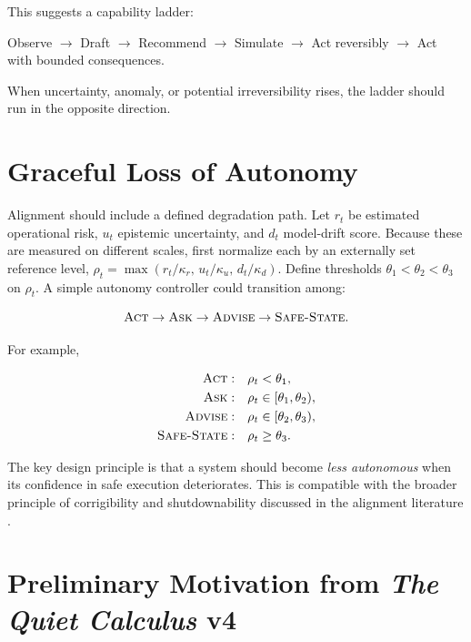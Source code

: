 \documentclass[11pt]{article}
\begin{document}
This suggests a capability ladder:

\begin{center}
Observe $\rightarrow$ Draft $\rightarrow$ Recommend $\rightarrow$ Simulate $\rightarrow$ Act reversibly $\rightarrow$ Act with bounded consequences.
\end{center}

When uncertainty, anomaly, or potential irreversibility rises, the ladder should run in the opposite direction.

\section{Graceful Loss of Autonomy}
\label{sec:graceful}

Alignment should include a defined degradation path. Let $r_t$ be estimated operational risk, $u_t$ epistemic uncertainty, and $d_t$ model-drift score. Because these are measured on different scales, first normalize each by an externally set reference level, $\rho_t=\max(r_t/\kappa_r,\,u_t/\kappa_u,\,d_t/\kappa_d)$. Define thresholds $\theta_1 < \theta_2 < \theta_3$ on $\rho_t$. A simple autonomy controller could transition among:

\begin{equation}
    \textsc{Act} \rightarrow \textsc{Ask} \rightarrow \textsc{Advise} \rightarrow \textsc{Safe-State}.
\end{equation}

For example,

\begin{align}
\textsc{Act}:&\quad \rho_t < \theta_1,\\
\textsc{Ask}:&\quad \rho_t \in [\theta_1,\theta_2),\\
\textsc{Advise}:&\quad \rho_t \in [\theta_2,\theta_3),\\
\textsc{Safe-State}:&\quad \rho_t \ge \theta_3.
\end{align}

The key design principle is that a system should become \emph{less autonomous} when its confidence in safe execution deteriorates. This is compatible with the broader principle of corrigibility and shutdownability discussed in the alignment literature \cite{hadfield2017}.

\section{Preliminary Motivation from \emph{The Quiet Calculus} v4}
\end{document}

